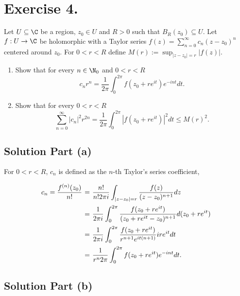 \section*{Exercise 4.}

Let $U\subseteq \C$ be a region, $z_0\in U$ and $R > 0$ such that $B_R(z_0) \subseteq U$. Let $f: U \to \C$ be holomorphic with a Taylor series $f(z) = \sum_{n = 0}^{\infty} c_n(z-z_0)^n$ centered around $z_0$. For $0< r < R$ define $M(r) := \sup_{|z-z_0| = r}|f(z)|$.
\begin{enumerate}[label=(\alph*)]
    \item Show that for every $n \in \N_0$ and $0< r < R$
    \[ c_n r^n = \frac{1}{2\pi} \int_0^{2\pi} f(z_0 + re^{it})e^{-int} dt. \]
    \item Show that for every $0< r < R$
    \[ \sum_{n=0}^{\infty} |c_n|^{2}r^{2n} = \frac{1}{2\pi} \int_{0}^{2\pi} |f(z_0+re^{it})|^2 dt \leq M(r)^2. \]
\end{enumerate}

\subsection*{Solution Part (a)}

For $0<r<R$, $c_n$ is defined as the $n$-th Taylor's series coefficient,
\[ \everymath{\displaystyle}
\arraycolsep=1.8pt\def\arraystretch{2.5}
\begin{array}{rcl}
    c_n = \frac{f^{(n)}(z_0)}{n!} & = & \frac{n!}{n! 2\pi i} \int_{|z-z_0| = r} \frac{f(z)}{(z-z_0)^{n+1}} dz\\
    & = & \frac{1}{2\pi i} \int_{0}^{2\pi} \frac{f(z_0+re^{it})}{(z_0+re^{it}-z_0)^{n+1}} d(z_0+re^{it})\\
    & = & \frac{1}{2\pi i} \int_{0}^{2\pi} \frac{f(z_0+re^{it})}{r^{n+1}e^{it(n+1)}} ire^{it} dt\\
    & = & \frac{1}{r^n 2\pi } \int_0^{2\pi} f(z_0 + re^{it})e^{-int} dt.
\end{array} \]

\subsection*{Solution Part (b)}

